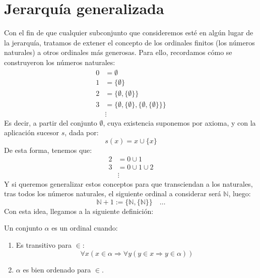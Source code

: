 \section{Jerarquía generalizada}
Con el fin de que cualquier subconjunto que consideremos esté en algún lugar de la jerarquía, tratamos de extener el concepto de los ordinales finitos (los números naturales) a otros ordinales más generosas. Para ello, recordamos cómo se construyeron los números naturales:
\begin{align*}
    0 &= \emptyset  \\
    1 &= \{\emptyset \} \\
    2 &= \{\emptyset , \{\emptyset \}\} \\
    3 &= \{\emptyset , \{\emptyset \}, \{\emptyset , \{\emptyset \}\}\} \\
      &\vdots
\end{align*}
Es decir, a partir del conjunto $\emptyset $, cuya existencia suponemos por axioma, y con la aplicación sucesor $s$, dada por:
\begin{equation*}
    s(x) = x\cup \{x\}
\end{equation*}
De esta forma, tenemos que:
\begin{align*}
    2 &= 0 \cup 1 \\
    3 &= 0 \cup 1 \cup 2 \\
      &\vdots
\end{align*}
Y si queremos generalizar estos conceptos para que transciendan a los naturales, tras todos los números naturales, el siguiente ordinal a considerar será $\mathbb{N}$, luego:
\begin{equation*}
    \mathbb{N}+1 := \{\mathbb{N}, \{\mathbb{N}\}\} \quad \ldots
\end{equation*}
Con esta idea, llegamos a la siguiente definición:

\begin{definicion}[Ordinal]
    Un conjunto $\alpha$ es un ordinal cuando:
    \begin{enumerate}
        \item Es transitivo para $\in $:
            \begin{equation*}
                \forall x(x\in \alpha \Longrightarrow \forall y(y\in x\Longrightarrow y\in \alpha))
            \end{equation*}
        \item $\alpha$ es bien ordenado para $\in $.
    \end{enumerate}
\end{definicion}
